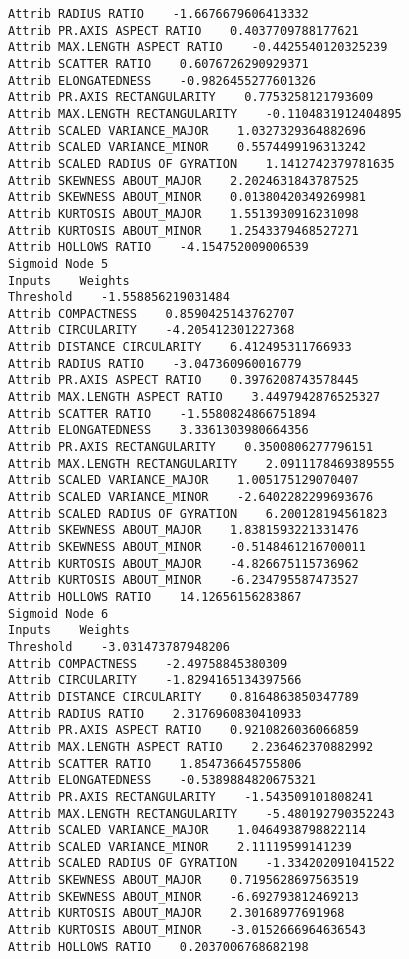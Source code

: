 \documentclass[
	article,			%
	11pt,				%
	oneside,			%
	a4paper,			%
	english,			%
	brazil,				%
	sumario=tradicional
	]{abntex2}
\begin{document}
\begin{lstlisting}
Attrib RADIUS RATIO    -1.6676679606413332
Attrib PR.AXIS ASPECT RATIO    0.4037709788177621
Attrib MAX.LENGTH ASPECT RATIO    -0.4425540120325239
Attrib SCATTER RATIO    0.6076726290929371
Attrib ELONGATEDNESS    -0.9826455277601326
Attrib PR.AXIS RECTANGULARITY    0.7753258121793609
Attrib MAX.LENGTH RECTANGULARITY    -0.1104831912404895
Attrib SCALED VARIANCE_MAJOR    1.0327329364882696
Attrib SCALED VARIANCE_MINOR    0.5574499196313242
Attrib SCALED RADIUS OF GYRATION    1.1412742379781635
Attrib SKEWNESS ABOUT_MAJOR    2.2024631843787525
Attrib SKEWNESS ABOUT_MINOR    0.01380420349269981
Attrib KURTOSIS ABOUT_MAJOR    1.5513930916231098
Attrib KURTOSIS ABOUT_MINOR    1.2543379468527271
Attrib HOLLOWS RATIO    -4.154752009006539
Sigmoid Node 5
Inputs    Weights
Threshold    -1.558856219031484
Attrib COMPACTNESS    0.8590425143762707
Attrib CIRCULARITY    -4.205412301227368
Attrib DISTANCE CIRCULARITY    6.412495311766933
Attrib RADIUS RATIO    -3.047360960016779
Attrib PR.AXIS ASPECT RATIO    0.3976208743578445
Attrib MAX.LENGTH ASPECT RATIO    3.4497942876525327
Attrib SCATTER RATIO    -1.5580824866751894
Attrib ELONGATEDNESS    3.3361303980664356
Attrib PR.AXIS RECTANGULARITY    0.3500806277796151
Attrib MAX.LENGTH RECTANGULARITY    2.0911178469389555
Attrib SCALED VARIANCE_MAJOR    1.005175129070407
Attrib SCALED VARIANCE_MINOR    -2.6402282299693676
Attrib SCALED RADIUS OF GYRATION    6.200128194561823
Attrib SKEWNESS ABOUT_MAJOR    1.8381593221331476
Attrib SKEWNESS ABOUT_MINOR    -0.5148461216700011
Attrib KURTOSIS ABOUT_MAJOR    -4.826675115736962
Attrib KURTOSIS ABOUT_MINOR    -6.234795587473527
Attrib HOLLOWS RATIO    14.12656156283867
Sigmoid Node 6
Inputs    Weights
Threshold    -3.031473787948206
Attrib COMPACTNESS    -2.49758845380309
Attrib CIRCULARITY    -1.8294165134397566
Attrib DISTANCE CIRCULARITY    0.8164863850347789
Attrib RADIUS RATIO    2.3176960830410933
Attrib PR.AXIS ASPECT RATIO    0.9210826036066859
Attrib MAX.LENGTH ASPECT RATIO    2.236462370882992
Attrib SCATTER RATIO    1.854736645755806
Attrib ELONGATEDNESS    -0.5389884820675321
Attrib PR.AXIS RECTANGULARITY    -1.543509101808241
Attrib MAX.LENGTH RECTANGULARITY    -5.480192790352243
Attrib SCALED VARIANCE_MAJOR    1.0464938798822114
Attrib SCALED VARIANCE_MINOR    2.11119599141239
Attrib SCALED RADIUS OF GYRATION    -1.334202091041522
Attrib SKEWNESS ABOUT_MAJOR    0.7195628697563519
Attrib SKEWNESS ABOUT_MINOR    -6.692793812469213
Attrib KURTOSIS ABOUT_MAJOR    2.30168977691968
Attrib KURTOSIS ABOUT_MINOR    -3.0152666964636543
Attrib HOLLOWS RATIO    0.2037006768682198

\end{lstlisting}
\end{document}
